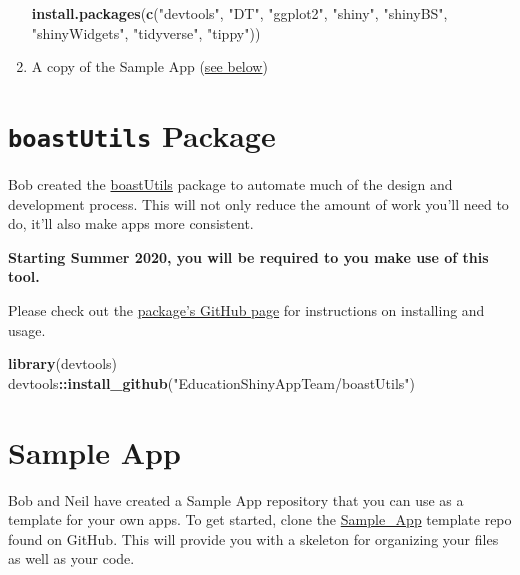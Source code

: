 \documentclass[
]{book}
\newenvironment{Shaded}{\begin{snugshade}}{\end{snugshade}}
\newcommand{\KeywordTok}[1]{\textcolor[rgb]{0.13,0.29,0.53}{\textbf{#1}}}
\newcommand{\NormalTok}[1]{#1}
\newcommand{\OperatorTok}[1]{\textcolor[rgb]{0.81,0.36,0.00}{\textbf{#1}}}
\newcommand{\StringTok}[1]{\textcolor[rgb]{0.31,0.60,0.02}{#1}}
\begin{document}
\begin{enumerate}
\begin{Shaded}
\begin{Highlighting}[]
\KeywordTok{install.packages}\NormalTok{(}\KeywordTok{c}\NormalTok{(}\StringTok{"devtools"}\NormalTok{, }\StringTok{"DT"}\NormalTok{, }\StringTok{"ggplot2"}\NormalTok{, }\StringTok{"shiny"}\NormalTok{, }\StringTok{"shinyBS"}\NormalTok{, }
                   \StringTok{"shinyWidgets"}\NormalTok{, }\StringTok{"tidyverse"}\NormalTok{, }\StringTok{"tippy"}\NormalTok{))}
\end{Highlighting}
\end{Shaded}
\item
  A copy of the Sample App (\protect\hyperlink{sample-app}{see below})
\end{enumerate}

\hypertarget{boastutils-package}{%
\section{\texorpdfstring{\texttt{boastUtils} Package}{boastUtils Package}}\label{boastutils-package}}

Bob created the \href{https://github.com/EducationShinyAppTeam/boastUtils}{boastUtils} package to automate much of the design and development process. This will not only reduce the amount of work you'll need to do, it'll also make apps more consistent.

\textbf{Starting Summer 2020, you will be required to you make use of this tool.}

Please check out the \href{https://github.com/EducationShinyAppTeam/boastUtils}{package's GitHub page} for instructions on installing and usage.

\begin{Shaded}
\begin{Highlighting}[]
\KeywordTok{library}\NormalTok{(devtools)}
\NormalTok{devtools}\OperatorTok{::}\KeywordTok{install_github}\NormalTok{(}\StringTok{"EducationShinyAppTeam/boastUtils"}\NormalTok{)}
\end{Highlighting}
\end{Shaded}

\hypertarget{sample-app}{%
\section{Sample App}\label{sample-app}}

Bob and Neil have created a Sample App repository that you can use as a template for your own apps. To get started, clone the \href{https://github.com/EducationShinyAppTeam/Sample_App}{Sample\_App} template repo found on GitHub. This will provide you with a skeleton for organizing your files as well as your code.
\end{document}
